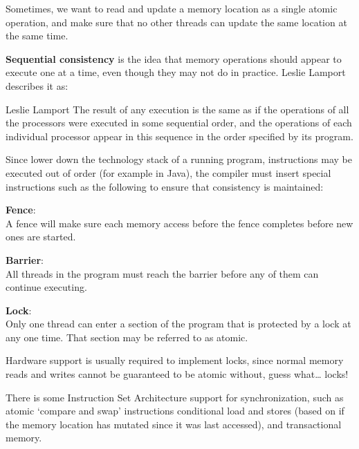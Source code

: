 
Sometimes, we want to read and update a memory location as a single atomic
operation, and make sure that no other threads can update the same location at
the same time.

\textbf{Sequential consistency} is the idea that memory operations should appear
to execute one at a time, even though they may not do in practice. Leslie
Lamport describes it as:

\begin{aquote}{Leslie Lamport}
  The result of any execution is the same as if the operations of all the
  processors were executed in some sequential order, and the operations of each
  individual processor appear in this sequence in the order specified by its
  program.
\end{aquote}

Since lower down the technology stack of a running program, instructions may be
executed out of order (for example in Java), the compiler must insert special
instructions such as the following to ensure that consistency is maintained:

\begin{description}
  \item \textbf{Fence}:\\
    A fence will make sure each memory access before the fence completes before
    new ones are started.
  \item \textbf{Barrier}:\\
    All threads in the program must reach the barrier before any of them can
    continue executing.
  \item \textbf{Lock}:\\
    Only one thread can enter a section of the program that is protected by a 
    lock at any one time. That section may be referred to as atomic.

    Hardware support is usually required to implement locks, since normal memory
    reads and writes cannot be guaranteed to be atomic without, guess what\dots
    locks!
\end{description}

There is some Instruction Set Architecture support for synchronization, such as
atomic `compare and swap' instructions conditional load and stores (based on if
the memory location has mutated since it was last accessed), and transactional
memory.

